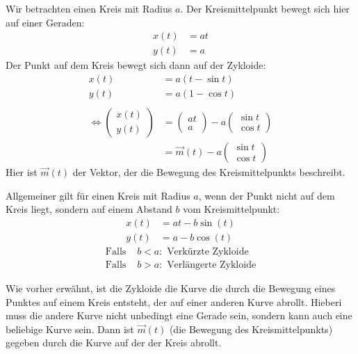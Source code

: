 \documentclass[12pt]{article}
\newcommand{\sameas}{\Longleftrightarrow}
\newenvironment{definition}[2][Definition]{\begin{trivlist}
        \item[\hskip \labelsep {\bfseries #1}\hskip \labelsep {\bfseries #2.}]}{\flushright{$\square$}\end{trivlist}}
\newenvironment{remark}[2][Bemerkung]{\begin{trivlist}
        \item[\hskip \labelsep {\bfseries #1}\hskip \labelsep {\bfseries #2.}]}{\end{trivlist}}
\begin{document}
\begin{definition}{[Zykloide]}
    Wir betrachten einen Kreis mit Radius $a$. Der Kreismittelpunkt bewegt sich hier auf einer Geraden: 
    \begin{align*}
        x(t) &= at\\
        y(t) &= a
    \end{align*}
    Der Punkt auf dem Kreis bewegt sich dann auf der Zykloide:
    \begin{align*}
        x(t) &= a(t - \sin t)\\
        y(t) &= a(1 - \cos t)\\\\
        \sameas \begin{pmatrix}
            x(t)\\
            y(t)
        \end{pmatrix}
        &= \begin{pmatrix}
            at\\
            a
        \end{pmatrix}
        - a\begin{pmatrix}
            \sin t\\
            \cos t
        \end{pmatrix}\\
        &= \vec{m}(t)-a\begin{pmatrix}
            \sin t\\
            \cos t
        \end{pmatrix}
    \end{align*}
    Hier ist $\vec{m}(t)$ der Vektor, der die Bewegung des Kreismittelpunkts beschreibt.

    Allgemeiner gilt für einen Kreis mit Radius $a$, wenn der Punkt nicht auf dem Kreis liegt, sondern auf einem Abstand $b$ vom Kreismittelpunkt:
    \begin{align*}
        x(t) &= at - b\sin(t) \\
        y(t) &= a - b\cos(t) 
    \end{align*}
    \begin{align*}
        \text{Falls }&b<a: \text{ Verkürzte Zykloide}\\
        \text{Falls }&b>a: \text{ Verlängerte Zykloide}
    \end{align*}

    \begin{remark}{[Mehr als Geraden]}
            Wie vorher erwähnt, ist die Zykloide die Kurve die durch die Bewegung eines Punktes auf einem Kreis entsteht, der auf einer anderen Kurve abrollt. Hieberi muss die andere Kurve nicht unbedingt eine Gerade sein, sondern kann auch eine beliebige Kurve sein. Dann ist $\vec{m}(t)$ (die Bewegung des Kreismittelpunkts) gegeben durch die Kurve auf der der Kreis abrollt.
    \end{remark}
\end{definition}
\end{document}
